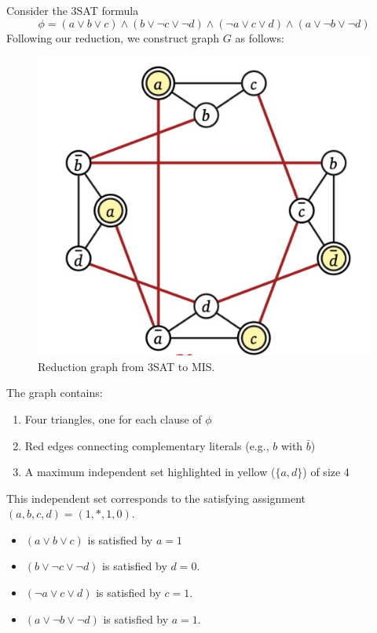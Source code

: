     \begin{example}
      Consider the 3SAT formula 
      \begin{equation}
        \phi = (a \lor b \lor c) \land (b \lor \neg c \lor \neg d) \land (\neg a \lor c \lor d) \land (a \lor \neg b \lor \neg d)
      \end{equation}
      Following our reduction, we construct graph $G$ as follows:

      \begin{figure}[H]
        \centering 
        \includegraphics[scale=0.4]{img/mis_graph.png}
        \caption{Reduction graph from 3SAT to MIS. } 
        \label{fig:mis_graph}
      \end{figure}

      The graph contains:
      \begin{enumerate}
        \item Four triangles, one for each clause of $\phi$
        \item Red edges connecting complementary literals (e.g., $b$ with $\bar{b}$)
        \item A maximum independent set highlighted in yellow ($\{a, d\}$) of size 4
      \end{enumerate} 

      This independent set corresponds to the satisfying assignment $(a, b, c, d) = (1, \ast, 1, 0)$. 
      \begin{itemize}
        \item $(a \lor b \lor c)$ is satisfied by $a = 1$
        \item $(b \lor \neg c \lor \neg d)$ is satisfied by $d = 0$. 
        \item $(\neg a \lor c \lor d)$ is satisfied by $c = 1$. 
        \item $(a \lor \neg b \lor \neg d)$ is satisfied by $a = 1$. 
      \end{itemize}


\end{example}
